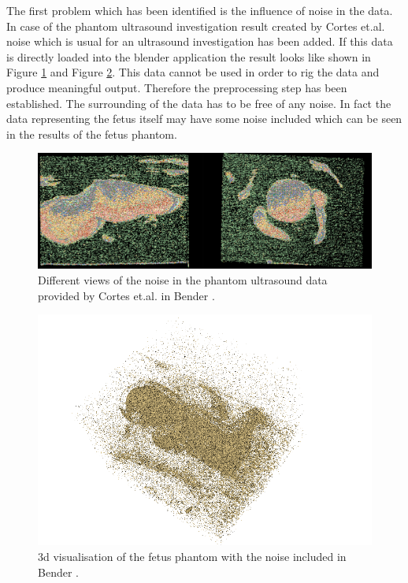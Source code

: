 The first problem which has been identified is the influence of noise in the data. In case of the phantom ultrasound investigation result created by Cortes et.al. \cite{Cortes2016UltrasoundEvaluation} noise which is usual for an ultrasound investigation has been added. If this data is directly loaded into the blender application the result looks like shown in Figure \ref{fig:noiseVies} and Figure \ref{fig:noise3D}. This data cannot be used in order to rig the data and produce meaningful output. Therefore the preprocessing step has been established. The surrounding of the data has to be free of any noise. In fact the data representing the fetus itself may have some noise included which can be seen in the results of the fetus phantom.

\begin{figure} [htb!]
    \centering
	\includegraphics[width=13cm]{content/images/influence/viewsNoise.png}
	\caption{Different views of the noise in the phantom ultrasound data provided by Cortes et.al. \cite{Cortes2016UltrasoundEvaluation} in Bender \cite{Finet2014Bender:Morphing}.}
	\label{fig:noiseVies}
\end{figure}

\begin{figure} [htb!]
    \centering
	\includegraphics[width=13cm]{content/images/influence/noise3D.png}
	\caption{\gls{3d} visualisation of the fetus phantom with the noise included in Bender \cite{Finet2014Bender:Morphing}.}
	\label{fig:noise3D}
\end{figure}


